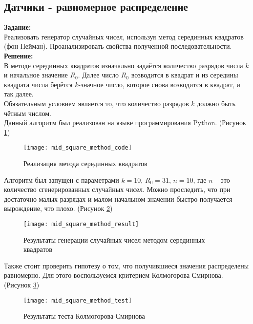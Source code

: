 \subsection*{Датчики - равномерное распределение}

\textbf{Задание:}\\
Реализовать генератор случайных чисел, используя метод серединных квадратов (фон Нейман). Проанализировать свойства полученной последовательности.\\

\textbf{Решение:}\\
В методе серединных квадратов изначально задаётся количество разрядов числа $k$ и начальное значение $R_0$. Далее число $R_0$ возводится в квадрат и из середины квадрата числа берётся $k$-значное число, которое снова возводится в квадрат, и так далее.\\
Обязательным условием является то, что количество разрядов $k$ должно быть чётным числом.\\
\newline
Данный алгоритм был реализован на языке программирования Python. (Рисунок \ref{fig:mid_square_method_code})
\begin{figure}[h]
	\centering \texttt{[image: mid\_square\_method\_code]}
	\caption{Реализация метода серединных квадратов}
	\label{fig:mid_square_method_code}
\end{figure}
\newpage
Алгоритм был запущен с параметрами $k = 10$, $R_0 = 31$, $n = 10$, где $n$ -- это количество сгенерированных случайных чисел. Можно проследить, что при достаточно малых разрядах и малом начальном значении быстро получается вырождение, что плохо. (Рисунок \ref{fig:mid_square_method_result})
\begin{figure}[h]
	\centering \texttt{[image: mid\_square\_method\_result]}
	\caption{Результаты генерации случайных чисел методом серединных квадратов}
	\label{fig:mid_square_method_result}
\end{figure}

Также стоит проверить гипотезу о том, что получившиеся значения распределены равномерно. Для этого воспользуемся критерием Колмогорова-Смирнова. (Рисунок \ref{fig:mid_square_method_test})
\begin{figure}[h]
	\centering \texttt{[image: mid\_square\_method\_test]}
	\caption{Результаты теста Колмогорова-Смирнова}
	\label{fig:mid_square_method_test}
\end{figure}

